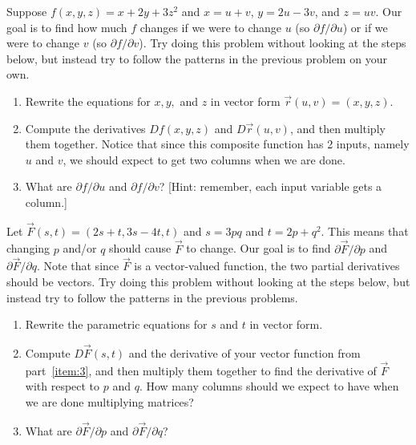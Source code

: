 \begin{problem}%
 Suppose $f(x,y,z) = x+2y+3z^2$ and $x=u+v$, $y=2u-3v$, and $z=uv$. Our goal is to find how much $f$ changes if we were to change $u$ (so $\partial f/\partial u$) or if we were to change $v$ (so $\partial f/\partial v$). Try doing this problem without looking at the steps below, but instead try to follow the patterns in the previous problem on your own. 
 \begin{enumerate}
  \item Rewrite the equations for $x,y,$ and $z$ in vector form $\vec r(u,v)=(x,y,z)$. %
  \item Compute the derivatives $Df(x,y,z)$ and $D\vec r(u,v)$, and then multiply them together. Notice that since this composite function has 2 inputs, namely $u$ and $v$, we should expect to get two columns when we are done.
  \item What are $\partial f/\partial u$ and $\partial f/\partial v$? [Hint: remember, each input variable gets a column.]
 \end{enumerate}
\end{problem}


\begin{problem}
 Let $\vec F(s,t) = (2s+t,3s-4t,t)$ and $s=3pq$ and $t=2p+q^2$.  This means that changing $p$ and/or $q$ should cause $\vec F$ to change. Our goal is to find $\partial \vec F/\partial p$ and $\partial \vec F/\partial q$. Note that since $\vec F$ is a vector-valued function, the two partial derivatives should be vectors. Try doing this problem without looking at the steps below, but instead try to follow the patterns in the previous problems. 
 \begin{enumerate}
  \item\label{item:3} Rewrite the parametric equations for $s$ and $t$ in vector form.
  \item Compute $D\vec F(s,t)$ and the derivative of your vector function from part~\ref{item:3}, and then multiply them together to find the derivative of $\vec F$ with respect to $p$ and $q$.  How many columns should we expect to have when we are done multiplying matrices?
  \item What are $\partial \vec F/\partial p$ and $\partial \vec F/\partial q$? 
 \end{enumerate}
\end{problem}

